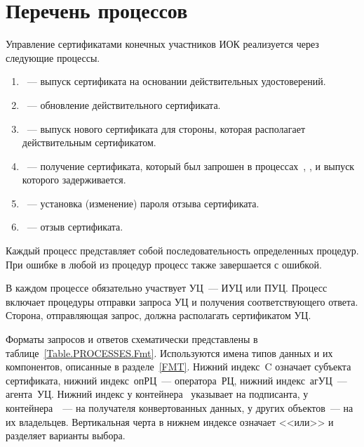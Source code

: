 \section{Перечень процессов}\label{PROCESSES.List}

Управление сертификатами конечных участников ИОК реализуется через следующие
процессы.

\begin{enumerate}
\item
{}~--- 
выпуск сертификата на основании действительных удостоверений.
\item
{}~--- 
обновление действительного сертификата.
\item
{}~--- 
выпуск нового сертификата для стороны, которая располагает действительным
сертификатом.
\item
{}~--- 
получение сертификата, который был запрошен в процессах~,
,  и выпуск которого задерживается.
\item
{}~--- 
установка (изменение) пароля отзыва сертификата.
\item
{}~--- 
отзыв сертификата.
\end{enumerate}

Каждый процесс представляет собой последовательность определенных процедур. 
При ошибке в любой из процедур процесс также завершается с ошибкой.

В каждом процессе обязательно участвует УЦ~--- ИУЦ или ПУЦ. Процесс
включает процедуры отправки запроса УЦ и получения соответствующего ответа.
Сторона, отправляющая запрос, должна располагать сертификатом УЦ.

Форматы запросов и ответов схематически представлены в
таблице~\ref{Table.PROCESSES.Fmt}. Используются имена типов данных и их
компонентов, описанные в разделе~\ref{FMT}. Нижний индекс~C означает субъекта
сертификата, нижний индекс~опРЦ~--- оператора~РЦ, нижний индекс~агУЦ~---
агента~УЦ.
%
Нижний индекс у контейнера~ указывает на подписанта, у
контейнера~~--- на получателя конвертованных данных, у
других объектов~--- на их владельцев.
%
Вертикальная черта в нижнем индексе означает <<или>> и разделяет варианты 
выбора.


